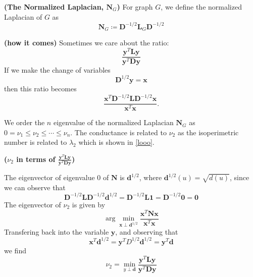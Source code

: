 \documentclass{article}
\newcommand{\bsl}[1]{\boldsymbol{#1}}
\newcommand{\bfs}[1]{\textbf{({#1}) }}
\begin{document}
\begin{defa}{\bfs{The Normalized Laplacian, $\boldsymbol{N}_G$}}For graph $G$, we define the normalized Laplacian of $G$ as 
$$
\boldsymbol{N}_G \coloneqq \boldsymbol{D}^{-1 / 2} \boldsymbol{L}_G \boldsymbol{D}^{-1 / 2}
$$
\end{defa} 
\begin{rema}{\bfs{how it comes}}Sometimes we care about the ratio:
$$
\frac{\boldsymbol{y}^{T} \boldsymbol{L} \boldsymbol{y}}{\boldsymbol{y}^{T} \boldsymbol{D} \boldsymbol{y}}
$$
If we make the change of variables
$$
\boldsymbol{D}^{1 / 2} \boldsymbol{y}=\boldsymbol{x}
$$
then this ratio becomes
$$
\frac{\boldsymbol{x}^{T} \boldsymbol{D}^{-1 / 2} \boldsymbol{L} \boldsymbol{D}^{-1 / 2} \boldsymbol{x}}{\boldsymbol{x}^{T} \boldsymbol{x}} .
$$
\end{rema}




We order the $n$ eigenvalue of the normalized Laplacian $\boldsymbol{N}_G$ as  $0=\nu_{1} \leq \nu_{2} \leq \cdots \leq \nu_{n}$.
The conductance is related to $\nu_{2}$ as the isoperimetric number is related to $\lambda_{2}$ which is shown in \cref{looo}.

\begin{rema}{\bfs{$\nu_{2}$ in terms of $
\frac{\boldsymbol{y}^{T} \boldsymbol{L} \boldsymbol{y}}{\boldsymbol{y}^{T} \boldsymbol{D} \boldsymbol{y}}
$}}\label{v2:aaa}

The eigenvector of eigenvalue $0$ of $\boldsymbol{N}$ is $\boldsymbol{d}^{1 / 2}$, where $\boldsymbol{d}^{1 / 2}(u)=\sqrt{d(u)}$, since we can observe that
$$
\boldsymbol{D}^{-1 / 2} \boldsymbol{L} \boldsymbol{D}^{-1 / 2} \boldsymbol{d}^{1 / 2}=\boldsymbol{D}^{-1 / 2} \boldsymbol{L} \mathbf{1}=\boldsymbol{D}^{-1 / 2} \mathbf{0}=\mathbf{0}
$$
The eigenvector of $\nu_{2}$ is given by
$$
\arg \min _{\bsl{x} \perp \bsl{d}^{1 / 2}} \frac{\boldsymbol{x}^{T} \boldsymbol{N} \boldsymbol{x}}{\boldsymbol{x}^{T} \boldsymbol{x}}
$$
Transfering back into the variable $\boldsymbol{y}$, and observing that
$$
\boldsymbol{x}^{T} \boldsymbol{d}^{1 / 2}=\boldsymbol{y}^{T} D^{1 / 2} \boldsymbol{d}^{1 / 2}=\boldsymbol{y}^{T} \boldsymbol{d}
$$
we find
$$
\nu_{2}=\min _{y \perp \bsl{d}} \frac{\boldsymbol{y}^{T} \boldsymbol{L} \boldsymbol{y}}{\boldsymbol{y}^{T} \boldsymbol{D} \boldsymbol{y}}
$$
\end{rema}
\end{document}
